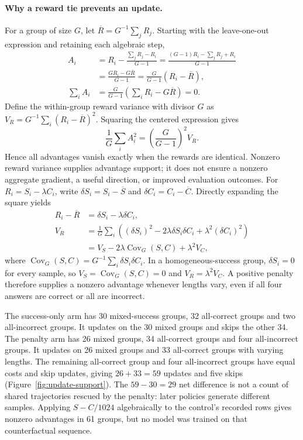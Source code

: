 \documentclass[11pt]{article}
\begin{document}
\paragraph{Why a reward tie prevents an update.}
For a group of size $G$, let $\overline R=G^{-1}\sum_j R_j$. Starting with the leave-one-out expression and retaining each algebraic step,
\begin{align}
A_i&=R_i-\frac{\sum_j R_j-R_i}{G-1}
=\frac{(G-1)R_i-\sum_j R_j+R_i}{G-1}\\
&=\frac{GR_i-G\overline R}{G-1}
=\frac{G}{G-1}(R_i-\overline R),\\
\sum_i A_i&=\frac{G}{G-1}\left(\sum_i R_i-G\overline R\right)=0.
\end{align}
Define the within-group reward variance with divisor $G$ as $V_R=G^{-1}\sum_i(R_i-\overline R)^2$. Squaring the centered expression gives
\begin{equation}
\frac1G\sum_i A_i^2=\left(\frac{G}{G-1}\right)^2 V_R.
\end{equation}
Hence all advantages vanish exactly when the rewards are identical. Nonzero reward variance supplies advantage support; it does not ensure a nonzero aggregate gradient, a useful direction, or improved evaluation outcomes. For $R_i=S_i-\lambda C_i$, write $\delta S_i=S_i-\overline S$ and $\delta C_i=C_i-\overline C$. Directly expanding the square yields
\begin{align}
R_i-\overline R&=\delta S_i-\lambda\delta C_i,\\
V_R&=\frac1G\sum_i\left((\delta S_i)^2-2\lambda\delta S_i\delta C_i+\lambda^2(\delta C_i)^2\right)\\
&=V_S-2\lambda\operatorname{Cov}_G(S,C)+\lambda^2 V_C,
\end{align}
where $\operatorname{Cov}_G(S,C)=G^{-1}\sum_i\delta S_i\delta C_i$. In a homogeneous-success group, $\delta S_i=0$ for every sample, so $V_S=\operatorname{Cov}_G(S,C)=0$ and $V_R=\lambda^2V_C$. A positive penalty therefore supplies a nonzero advantage whenever lengths vary, even if all four answers are correct or all are incorrect.

The success-only arm has 30 mixed-success groups, 32 all-correct groups and two all-incorrect groups. It updates on the 30 mixed groups and skips the other 34. The penalty arm has 26 mixed groups, 34 all-correct groups and four all-incorrect groups. It updates on 26 mixed groups and 33 all-correct groups with varying lengths. The remaining all-correct group and four all-incorrect groups have equal costs and skip updates, giving $26+33=59$ updates and five skips (Figure~\ref{fig:update-support}). The $59-30=29$ net difference is not a count of shared trajectories rescued by the penalty: later policies generate different samples. Applying $S-C/1024$ algebraically to the control's recorded rows gives nonzero advantages in 61 groups, but no model was trained on that counterfactual sequence.
\end{document}
